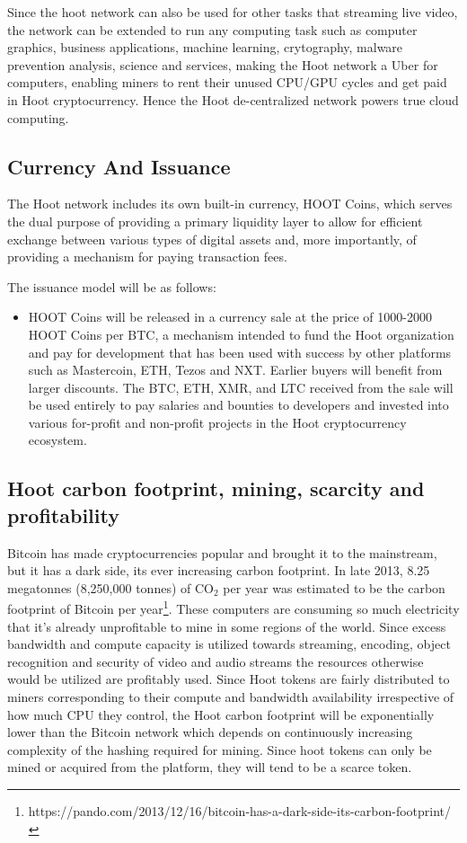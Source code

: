\documentclass{article}
\begin{document}
Since the hoot network can also be used for other tasks that streaming live video, the network can be extended to run any computing task such as computer graphics, business applications, machine learning, crytography, malware prevention analysis, science and services, making the Hoot network a Uber for computers, enabling miners to rent their unused CPU/GPU cycles and get paid in Hoot cryptocurrency. Hence the Hoot de-centralized network powers true cloud computing.

\subsection{Currency And Issuance}

The Hoot network includes its own built-in currency, HOOT Coins, which serves the dual purpose of providing a primary liquidity layer to allow for efficient exchange between various types of digital assets and, more importantly, of providing a mechanism for paying transaction fees.

The issuance model will be as follows:

\begin{itemize}

\item HOOT Coins will be released in a currency sale at the price of 1000-2000 HOOT Coins per BTC, a mechanism intended to fund the Hoot organization and pay for development that has been used with success by other platforms such as Mastercoin, ETH, Tezos and NXT. Earlier buyers will benefit from larger discounts. The BTC, ETH, XMR, and LTC received from the sale will be used entirely to pay salaries and bounties to developers and invested into various for-profit and non-profit projects in the Hoot cryptocurrency ecosystem.

\end{itemize}

\subsection{Hoot carbon footprint, mining, scarcity and profitability}
Bitcoin has made cryptocurrencies popular and brought it to the mainstream, but it has a dark side, its ever increasing carbon footprint. In late 2013, 8.25 megatonnes (8,250,000 tonnes) of CO$_2$ per year
was estimated to be the carbon footprint of Bitcoin per year\footnote{https://pando.com/2013/12/16/bitcoin-has-a-dark-side-its-carbon-footprint/}. These
computers are consuming so much electricity that it’s already
unprofitable to mine in some regions of the world. Since excess
bandwidth and compute capacity is utilized towards streaming,
encoding, object recognition
and security of video and audio streams the resources otherwise would
be utilized are profitably used.  Since Hoot tokens are fairly distributed to miners corresponding to their compute and bandwidth availability irrespective of how much CPU they control, the Hoot carbon footprint will be exponentially lower than the Bitcoin network which depends on continuously increasing complexity of the hashing required for mining. Since hoot tokens can only be mined or acquired from the platform, they will tend to be a scarce token.
\end{document}
